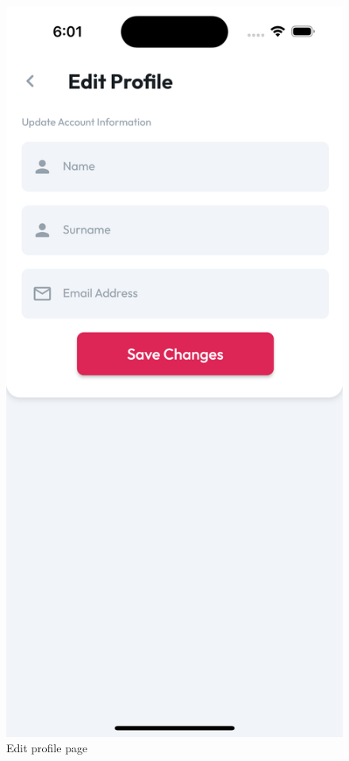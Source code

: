 \documentclass{Configuration_Files/PoliMi3i_thesis}
\begin{document}
\begin{figure}[!h]
  \includegraphics[scale=0.1]{Images/Screenshots/Mobile/EditProfileLight.png}
  \caption{Edit profile page}
\end{figure}

\clearpage
\end{document}
